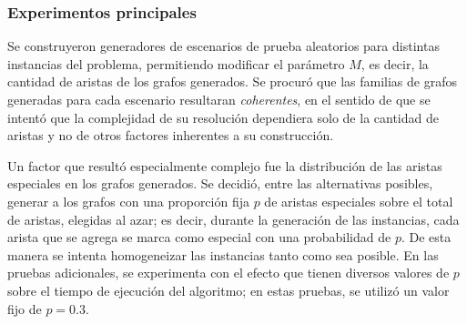     \subsubsection{Experimentos principales}

    \newcommand\constante{300}

    Se construyeron generadores de escenarios de prueba aleatorios para distintas
    instancias del problema, permitiendo modificar el parámetro $M$, es decir,
    la cantidad de aristas de los grafos generados. Se procuró que las familias
    de grafos generadas para cada escenario resultaran \emph{coherentes}, en
    el sentido de que se intentó que la complejidad de su resolución dependiera
    solo de la cantidad de aristas y no de otros factores inherentes a su
    construcción.

    Un factor que resultó especialmente complejo fue la distribución de las
    aristas especiales en los grafos generados. Se decidió, entre las alternativas
    posibles, generar a los grafos con una proporción fija $p$ de aristas
    especiales sobre el total de aristas, elegidas al azar; es decir, durante
    la generación de las instancias, cada arista que se agrega se marca como
    especial con una probabilidad de $p$. De esta manera se intenta
    homogeneizar las instancias tanto como sea posible. En las pruebas
    adicionales, se experimenta con el efecto que tienen diversos valores de
    $p$ sobre el tiempo de ejecución del algoritmo; en estas pruebas, se
    utilizó un valor fijo de $p = 0.3$.

